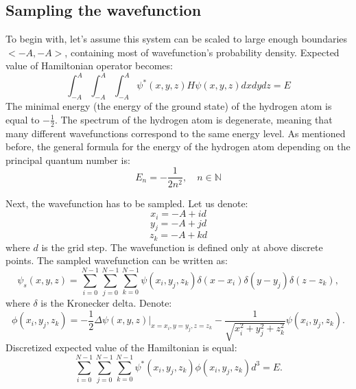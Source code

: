 \subsection{Sampling the wavefunction}

To begin with, let's assume this system can be scaled to large enough boundaries $<-A,-A>$, containing most of wavefunction's probability density. Expected value of Hamiltonian operator becomes:
\begin{equation}
	\int_{-A}^A\int_{-A}^{A}\int_{-A}^{A}\psi^{*}(x,y,z) H \psi(x,y,z)  dx dy dz = E
\end{equation}
The minimal energy (the energy of the ground state) of the hydrogen atom is equal to $-\frac{1}{2}$. The spectrum of the hydrogen atom
is degenerate, meaning that many different wavefunctions correspond to the
same energy level. As mentioned before, the general formula for the energy of the hydrogen atom
depending on the principal quantum number is:
\begin{equation}
	E_n = -\frac{1}{2n^2}, \quad n \in \mathbb{N}
\end{equation}


\noindent Next, the wavefunction has to be sampled. Let us denote:
	\begin{equation}
		x_i = -A + id
	\end{equation}
	\begin{equation}
		y_j = -A + jd
	\end{equation}	
	\begin{equation}
		z_k = -A + kd
	\end{equation}	
where $d$ is the grid step. 
The wavefunction is defined only at above discrete points. The sampled wavefunction can be written as:
\begin{equation}
	\psi_s(x,y,z) = \sum_{i=0}^{N-1}\sum_{j=0}^{N-1}\sum_{k=0}^{N-1}\psi(x_i,y_j,z_k)\delta(x-x_i)\delta(y-y_j)\delta(z-z_k),
\end{equation}
where $\delta$ is the Kronecker delta. %
Denote:
\begin{equation}
	\phi(x_i,y_j,z_k) = -\frac{1}{2}\Delta\psi(x,y,z)\rvert_{x=x_i,y=y_j,z=z_k}-\frac{1}{\sqrt{x_i^2+y_j^2+z_k^2}}\psi(x_i,y_j,z_k).
\end{equation}
Discretized expected value of the Hamiltonian is equal:
\begin{equation}
	\sum_{i=0}^{N-1}\sum_{j=0}^{N-1}\sum_{k=0}^{N-1}\psi^{*}(x_i,y_j,z_k)\phi(x_i,y_j,z_k)d^3 = E.
\end{equation}


